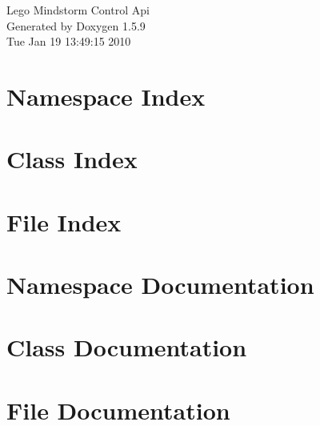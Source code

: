 \documentclass[a4paper]{book}
\begin{document}
\hypersetup{pageanchor=false}
\begin{titlepage}
\vspace*{7cm}
\begin{center}
{\Large Lego Mindstorm Control Api }\\
\vspace*{1cm}
{\large Generated by Doxygen 1.5.9}\\
\vspace*{0.5cm}
{\small Tue Jan 19 13:49:15 2010}\\
\end{center}
\end{titlepage}
\clearemptydoublepage
{}
\tableofcontents
\clearemptydoublepage
{}
\hypersetup{pageanchor=true}
\chapter{Namespace Index}

\chapter{Class Index}

\chapter{File Index}

\chapter{Namespace Documentation}

\chapter{Class Documentation}








\chapter{File Documentation}



\printindex
\end{document}
